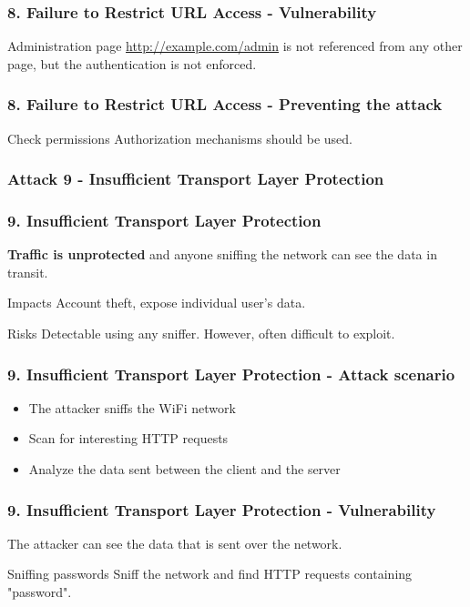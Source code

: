 \begin{frame}
\frametitle{8. Failure to Restrict URL Access - Vulnerability}
\begin{exampleblock}{Administration page}
\url{http://example.com/admin} is not referenced from any other page, but
the authentication is not enforced.
\end{exampleblock}
\end{frame}

\begin{frame}
\frametitle{8. Failure to Restrict URL Access - Preventing the attack}
\begin{block}{Check permissions}
Authorization mechanisms should be used.
\end{block}
\end{frame}

\subsubsection{Attack 9 - Insufficient Transport Layer Protection}

\begin{frame}
\frametitle{9. Insufficient Transport Layer Protection}
\textbf{Traffic is unprotected} and anyone sniffing the network can see the
data in transit.
\begin{block}{Impacts}
Account theft, expose individual user's data.
\end{block}
\begin{block}{Risks}
\alert{Detectable} using any sniffer.
However, often difficult to exploit.
\end{block}
\end{frame}

\begin{frame}
\frametitle{9. Insufficient Transport Layer Protection - Attack scenario}
\begin{itemize}
\item The attacker sniffs the WiFi network
\item Scan for interesting HTTP requests
\item Analyze the data sent between the client and the server
\end{itemize}
\end{frame}

\begin{frame}
\frametitle{9. Insufficient Transport Layer Protection - Vulnerability}
The attacker can see the data that is sent over the network.
\begin{exampleblock}{Sniffing passwords}
Sniff the network and find HTTP requests containing "password".
\end{exampleblock}
\end{frame}


